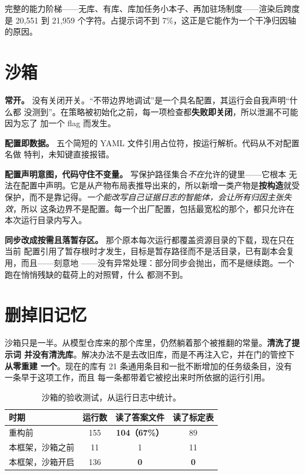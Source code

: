 \documentclass[11pt,a4paper,UTF8,fontset=macnew]{ctexrep}
\newcommand{\keyrule}[1]{\textbf{\textcolor{acc}{#1}}}
\begin{document}
完整的能力阶梯——无库、有库、库加任务小本子、再加驻场制度——渲染后跨度是 20{,}551 到
21{,}959 个字符。占提示词不到 7\%，这正是它能作为一个干净归因轴的原因。

\section{沙箱}

\keyrule{常开。} 没有关闭开关。“不带边界地调试”是一个具名配置，其运行会自我声明“什么都
没测到”。在策略被初始化之前，每一项检查都\textbf{失败即关闭}，所以泄漏不可能因为忘了
加一个 flag 而发生。

\keyrule{配置即数据。} 五个简短的 YAML 文件引用占位符，按运行解析。代码从不对配置名做
特判，未知键直接报错。

\keyrule{配置声明意图，代码守住不变量。} 写保护路径集合\emph{不在}允许的键里——它根本
无法在配置中声明。它是从产物布局表推导出来的，所以新增一类产物是\textbf{按构造}就受
保护，而不是靠记得。\emph{一个能改写自己证据日志的智能体，会让所有归因主张失效}，所以
这条边界不是配置。每一个出厂配置，包括最宽松的那个，都只允许在本次运行目录内写入。

\keyrule{同步改成按需且落暂存区。} 那个原本每次运行都覆盖资源目录的下载，现在只在当前
配置引用了暂存根时才发生，目标是暂存路径而不是活目录，已有副本会复用，而且——刻意地
——没有异常处理：部分同步会抛出，而不是继续跑。一个跑在悄悄残缺的载荷上的对照臂，什么
都测不到。

\section{删掉旧记忆}

沙箱只是一半。从模型仓库来的那个库里，仍然躺着那个被推翻的常量。\textbf{清洗了提示词
并没有清洗库}。解决办法不是去改旧库，而是不再注入它，并在门的管控下\textbf{从零重建
一个}。现在的库有 21 条通用条目和一批不断增加的任务级条目，没有一条早于这项工作，而且
每一条都带着它被挖出来时所依据的运行引用。

\begin{table}[htbp]
\centering\small
\begin{tabular}{@{}l c c c@{}}
\toprule
\textbf{时期} & \textbf{运行数} & \textbf{读了答案文件} & \textbf{读了标定表} \\
\midrule
重构前 & 155 & \textbf{104（67\%）} & 89 \\
本框架，沙箱之前 & 11 & 1 & 11 \\
本框架，沙箱开启 & 136 & \textbf{0} & \textbf{0} \\
\bottomrule
\end{tabular}
\caption{沙箱的验收测试，从运行日志中统计。}
\end{table}
\end{document}
